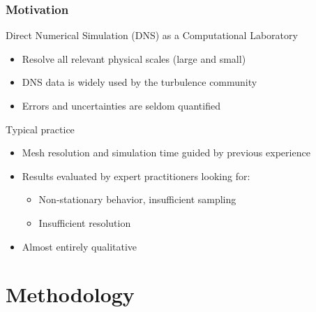 \documentclass[mathserif]{beamer}
\begin{document}
\begin{frame}
\frametitle{Motivation}

 \begin{block}{Direct Numerical Simulation (DNS) as a Computational Laboratory}
  \begin{itemize}
   \item Resolve all relevant physical scales (large and small)
   \item DNS data is widely used by the turbulence community
   \item Errors and uncertainties are seldom quantified 
 \end{itemize}

 \end{block}

 \begin{block}{Typical practice}
  \begin{itemize}
  \item Mesh resolution and simulation time guided by previous experience
  \item Results evaluated by expert practitioners looking for:
    \begin{itemize}
    \item Non-stationary behavior, insufficient sampling
    \item Insufficient resolution
    \end{itemize}
  \item Almost entirely qualitative
  \end{itemize}
\end{block}

\end{frame}

\section{Methodology}
\end{document}
